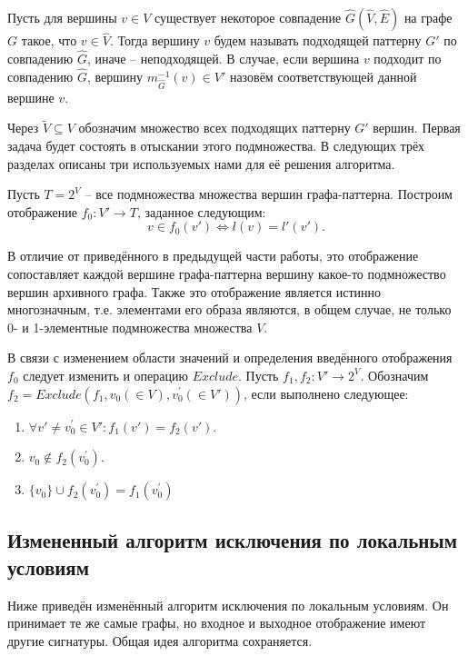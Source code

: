 Пусть для вершины $v \in V$ существует некоторое совпадение  $\widehat{G}(\widehat{V}, \widehat{E})$ на графе $G$ такое, что $v \in \widehat{V}$. Тогда вершину $v$ будем называть подходящей паттерну $G'$ по совпадению $\widehat{G}$, иначе -- неподходящей. В случае, если вершина $v$ подходит по совпадению $\widehat{G}$, вершину $m_{\widehat{G}}^{-1}(v) \in  V'$ назовём соответствующей данной вершине $v$.

Через $\widetilde{V} \subseteq V$ обозначим множество всех подходящих паттерну $G'$ вершин. Первая задача будет состоять в отыскании этого подмножества. В следующих трёх разделах описаны три используемых нами для её решения алгоритма.

Пусть $T = 2^{V}$ -- все подмножества множества вершин графа-паттерна. Построим отображение $f_0 : V' \to T$, заданное следующим:
\begin{equation}
v \in f_0(v') \Leftrightarrow l(v) = l'(v').
\end{equation}

В отличие от приведённого в предыдущей части работы, это отображение сопоставляет каждой вершине графа-паттерна вершину какое-то подмножество вершин архивного графа. Также это отображение является истинно многозначным, т.е. элементами его образа являются, в общем случае, не только 0- и 1-элементные подмножества множества $V$. 

В связи с изменением области значений и определения введённого отображения $f_0$ следует изменить и операцию $Exclude$. Пусть $f_1, f_2 : V' \to 2^{V}$. Обозначим $f_2 = Exclude(f_1, v_0 (\in V), v^{\prime}_0 (\in V'))$, если выполнено следующее:
\begin{enumerate}
	\item $\forall v' \ne v^{\prime}_0 \in V': f_1(v') = f_2(v')$.
	\item $v_0 \notin f_2(v^{\prime}_0)$.
	\item $\{v_0\} \cup f_2(v^{\prime}_0) = f_1(v^{\prime}_0)$
\end{enumerate}

\subsection{Измененный алгоритм исключения по локальным условиям}

Ниже приведён изменённый алгоритм исключения по локальным условиям. Он принимает те же самые графы, но входное и выходное отображение имеют другие сигнатуры. Общая идея алгоритма сохраняется.

